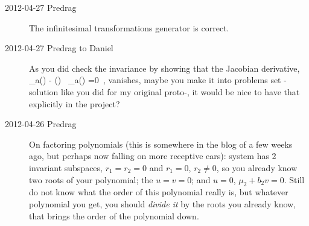 \begin{description}
\item[2012-04-27 Predrag] The infinitesimal transformations
generator  is correct.

\item[2012-04-27 Predrag to Daniel] As you did check the invariance by showing that
the Jacobian derivative,
\beq
  \groupTan_a(\vel)  - \Mvar(\ssp) \, \groupTan_a(\ssp) =0
  \,,
vanishes, maybe you make it into problems set - solution like you did for
my original proto-{\twoMode}, it would be nice to have that explicitly in the
{\twoMode} project?

\item[2012-04-26 Predrag] On factoring polynomials (this is somewhere in
the blog of a few weeks ago, but perhaps now falling on more receptive
ears): {\twoMode} system has 2 invariant subspaces, $r_1=r_2=0$ and
$r_1=0$, $r_2\neq 0$, so you already know two roots of your polynomial;
the $u=v=0$; and $u=0$, $\mu_2  +b_2 v =0$. Still do not know what the
order of this polynomial really is, but whatever polynomial you get, you
should \emph{divide it} by the roots you already know, that brings the
order of the polynomial down.


\end{description}
